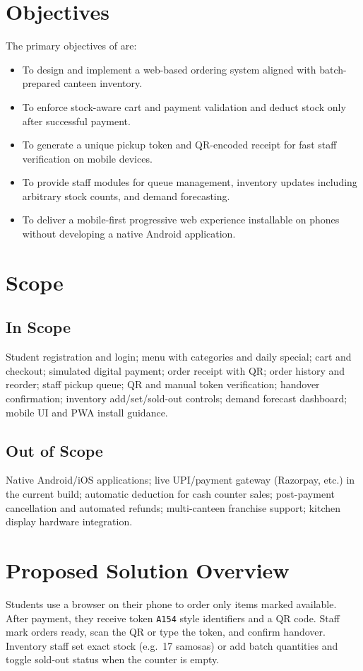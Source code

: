 \section{Objectives}
The primary objectives of \ShortTitle{} are:
\begin{itemize}
  \item To design and implement a web-based ordering system aligned with batch-prepared canteen inventory.
  \item To enforce stock-aware cart and payment validation and deduct stock only after successful payment.
  \item To generate a unique pickup token and QR-encoded receipt for fast staff verification on mobile devices.
  \item To provide staff modules for queue management, inventory updates including arbitrary stock counts, and demand forecasting.
  \item To deliver a mobile-first progressive web experience installable on phones without developing a native Android application.
\end{itemize}

\section{Scope}
\subsection{In Scope}
Student registration and login; menu with categories and daily special; cart and checkout; simulated digital payment; order receipt with QR; order history and reorder; staff pickup queue; QR and manual token verification; handover confirmation; inventory add/set/sold-out controls; demand forecast dashboard; mobile UI and PWA install guidance.

\subsection{Out of Scope}
Native Android/iOS applications; live UPI/payment gateway (Razorpay, etc.) in the current build; automatic deduction for cash counter sales; post-payment cancellation and automated refunds; multi-canteen franchise support; kitchen display hardware integration.

\section{Proposed Solution Overview}
Students use a browser on their phone to order only items marked available. After payment, they receive token \texttt{A154} style identifiers and a QR code. Staff mark orders ready, scan the QR or type the token, and confirm handover. Inventory staff set exact stock (e.g.\ 17 samosas) or add batch quantities and toggle sold-out status when the counter is empty.

